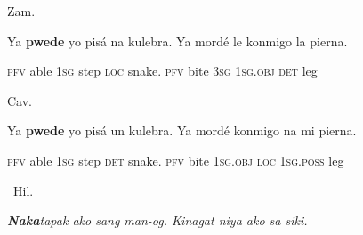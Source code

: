 \begin{listWWNumiileveli}
\item 
\begin{listWWNumiilevelii}
\item 
\begin{stylelsLanginfo}
Zam.
\end{stylelsLanginfo}
\end{listWWNumiilevelii}
\end{listWWNumiileveli}
\begin{stylelsSourceline}
Ya \textbf{pwede} yo pisá na kulebra. Ya mordé le konmigo la pierna.
\end{stylelsSourceline}

\begin{stylelsIMT}
\textsc{pfv} able \textsc{1sg} step \textsc{loc} snake. \textsc{pfv} bite 3\textsc{sg} 1\textsc{sg.obj} \textsc{det} leg
\end{stylelsIMT}

\begin{listWWNumiileveli}
\item 
\begin{listWWNumiilevelii}
\item 
\begin{stylelsLanginfo}
Cav.
\end{stylelsLanginfo}
\end{listWWNumiilevelii}
\end{listWWNumiileveli}
\begin{stylelsSourceline}
Ya \textbf{pwede} yo pisá un kulebra. Ya mordé konmigo na mi pierna.
\end{stylelsSourceline}

\begin{stylelsIMT}
\textsc{pfv} able \textsc{1sg} step \textsc{det} snake. \textsc{pfv} bite 1\textsc{sg.obj loc} 1\textsc{sg}.\textsc{poss} leg
\end{stylelsIMT}

\begin{listWWNumiileveli}
\item 
\begin{listWWNumiilevelii}
\item 
\begin{stylelsLanginfo}
\ Hil.
\end{stylelsLanginfo}
\end{listWWNumiilevelii}
\end{listWWNumiileveli}
\begin{stylelsIMT}
\textbf{\textit{Naka}}\textit{tapak ako sang man-og. Kinagat niya ako sa siki.}
\end{stylelsIMT}

